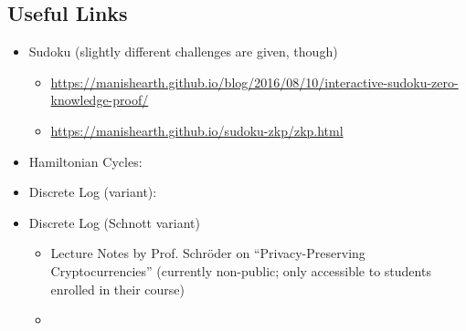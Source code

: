 \documentclass[border=1cm,varwidth=37cm]{standalone}
\begin{document}
\subsection*{Useful Links}
\begin{itemize}
	\item Sudoku (slightly different challenges are given, though)\begin{itemize}
		\item \url{https://manishearth.github.io/blog/2016/08/10/interactive-sudoku-zero-knowledge-proof/}
		\item \url{https://manishearth.github.io/sudoku-zkp/zkp.html}
	\end{itemize}
	\item Hamiltonian Cycles: \cite{wiki:zero-knowledge-proofs-hamiltonian-graphs}
	\item Discrete Log (variant): \cite{wiki:zero-knowledge-proofs-discrete-log}
	\item Discrete Log (Schnott variant)\begin{itemize}
		\item Lecture Notes by Prof. Schröder on \enquote{Privacy-Preserving Cryptocurrencies} (currently non-public; only accessible to students enrolled in their course)
		\item \cite{SchnorrZeroKnowledge}
	\end{itemize}
\end{itemize}

\printbibliography[heading=subbibliography]
\end{document}
